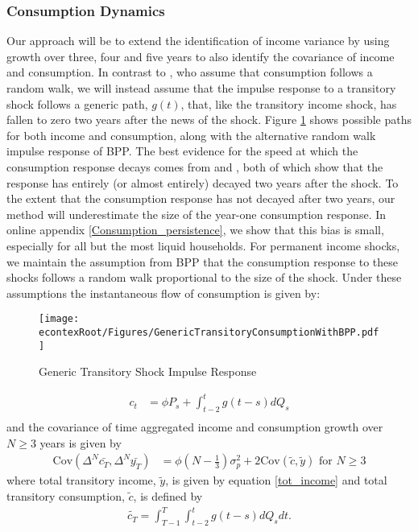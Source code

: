 \documentclass[titlepage]{\econtex}\newcommand{\texname}{ConsumptionHeterogeneity}
\begin{document}
	\subsubsection{Consumption Dynamics} \label{cons_dynamics}
	Our approach will be to extend the identification of income variance by using growth over three, four and five years to also identify the covariance of income and consumption. In contrast to \cite{blundell_consumption_2008}, who assume that consumption follows a random walk, we will instead assume that the impulse response to a transitory shock follows a generic path, $g(t)$, that, like the transitory income shock, has fallen to zero two years after the news of the shock. Figure \ref{fig:GenericTransitoryBPP} shows possible paths for both income and consumption, along with the alternative random walk impulse response of BPP. The best evidence for the speed at which the consumption response decays comes from \cite{gelman_what_2016} and \cite{fagereng_mpc_2016}, both of which show that the response has entirely (or almost entirely) decayed two years after the shock. To the extent that the consumption response has not decayed after two years, our method will underestimate the size of the year-one consumption response. In online appendix \ref{Consumption_persistence}, we show that this bias is small, especially for all but the most liquid households. For permanent income shocks, we maintain the assumption from BPP that the consumption response to these shocks follows a random walk proportional to the size of the shock. Under these assumptions the instantaneous flow of consumption is given by:	\begin{figure} 
		\begin{centering}
			\texttt{[image: \\econtexRoot/Figures/GenericTransitoryConsumptionWithBPP.pdf]} 
			\caption{Generic Transitory Shock Impulse Response}
			\label{fig:GenericTransitoryBPP}
		\end{centering}
	\end{figure}
	\begin{align*}
	c_t  &= \phi P_s  + \int_{t-2}^{t} g(t-s)dQ_s  \\
	\end{align*}
	and the covariance of time aggregated income and consumption growth over $N \geq 3$ years is given by
	\begin{align}
	\mathrm{Cov}(\Delta^N \bar{c_T},\Delta^N \bar{y_T} ) &= \phi (N-\frac{1}{3}) \sigma^2_p + 2 \mathrm{Cov}(\tilde{c},\tilde{y}) \text{  for  } N\geq 3 \label{covariance}
	\end{align}
	where total transitory income, $\tilde{y}$, is given by equation \ref{tot_income} and total transitory consumption, $\tilde{c}$, is defined by
	\begin{align}
	\tilde{c_T} = \int_{T-1}^{T}\int_{t-2}^{t} g(t-s)dQ_s dt \text{.}\label{tot_cons}
	\end{align}
	
\end{document}
